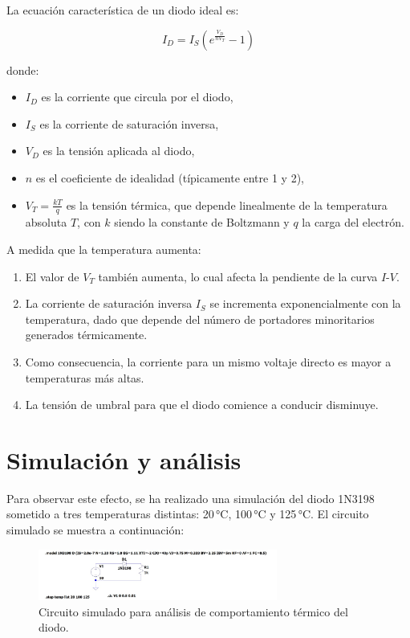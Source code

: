 \documentclass[chaptersright]{informeutn}
\begin{document}
    La ecuación característica de un diodo ideal es:
    
    \[
    I_D = I_S \left( e^{\frac{V_D}{n V_T}} - 1 \right)
    \]
    
    donde:
    \begin{itemize}
        \item \(I_D\) es la corriente que circula por el diodo,
        \item \(I_S\) es la corriente de saturación inversa,
        \item \(V_D\) es la tensión aplicada al diodo,
        \item \(n\) es el coeficiente de idealidad (típicamente entre 1 y 2),
        \item \(V_T = \frac{kT}{q}\) es la tensión térmica, que depende linealmente de la temperatura absoluta \(T\), con
            \(k\) siendo la constante de Boltzmann y \(q\) la carga del electrón.
    \end{itemize}
    
    A medida que la temperatura aumenta:
    \begin{enumerate}
        \item El valor de \(V_T\) también aumenta, lo cual afecta la pendiente de la curva \(I\)-\(V\).
        \item La corriente de saturación inversa \(I_S\) se incrementa exponencialmente con la temperatura, dado que 
            depende del número de portadores minoritarios generados térmicamente.
        \item Como consecuencia, la corriente para un mismo voltaje directo es mayor a temperaturas más altas.
        \item La tensión de umbral para que el diodo comience a conducir disminuye.
    \end{enumerate}
  
  \section{Simulación y análisis}
  
    Para observar este efecto, se ha realizado una simulación del diodo 1N3198 sometido a tres temperaturas distintas: 
    20 °C, 100 °C y 125 °C. El circuito simulado se muestra a continuación:
    
    \begin{figure}[H]
        \centering
        \includegraphics[width=0.7\textwidth]{pictures/comparacion_temperatura_circuito.jpeg}
        \caption{Circuito simulado para análisis de comportamiento térmico del diodo.}
    \end{figure}
    
\end{document}
